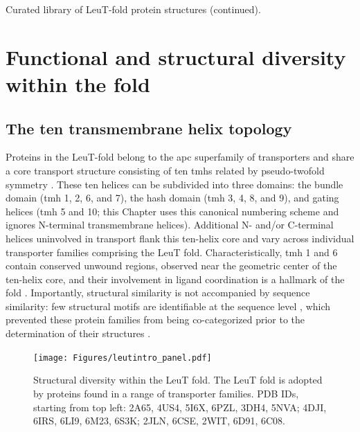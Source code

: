 \begin{table}[h!]
\scriptsize
\renewcommand{\tabcolsep}{0.15cm}
\centering
\caption[Curated library of LeuT-fold protein structures (continued).]{Curated library of LeuT-fold protein structures (continued).}

\label{tab:leutintro_proteins2}
\end{table}

\section{Functional and structural diversity within the fold}

\subsection{The ten transmembrane helix topology}

Proteins in the LeuT-fold belong to the \gls{apc} superfamily of transporters \citep*{Vastermark2014} and share a core transport structure consisting of ten \gls{tmh}s related by pseudo-twofold symmetry \citep*{Forrest2008, Kazmier2017}. These ten helices can be subdivided into three domains: the bundle domain (\gls{tmh} 1, 2, 6, and 7), the hash domain (\gls{tmh} 3, 4, 8, and 9), and gating helices (\gls{tmh} 5 and 10; this Chapter uses this canonical numbering scheme and ignores N-terminal transmembrane helices). Additional N- and/or C-terminal helices uninvolved in transport flank this ten-helix core and vary across individual transporter families comprising the LeuT fold. Characteristically, \gls{tmh} 1 and 6 contain conserved unwound regions, observed near the geometric center of the ten-helix core, and their involvement in ligand coordination is a hallmark of the fold \citep*{Screpanti2007}. Importantly, structural similarity is not accompanied by sequence similarity: few structural motifs are identifiable at the sequence level \citep*{Billesbølle2015, Malinauskaite2014, Stolzenberg2017}, which prevented these protein families from being co-categorized prior to the determination of their structures \citep*{Beuming2006}.

\begin{figure}[h!]
\centering
\texttt{[image: Figures/leutintro\_panel.pdf]}
 \caption[Structural diversity within the LeuT fold.]{Structural diversity within the LeuT fold. The LeuT fold is adopted by proteins found in a range of transporter families. PDB IDs, starting from top left: 2A65, 4US4, 5I6X, 6PZL, 3DH4, 5NVA; 4DJI, 6IRS, 6LI9, 6M23, 6S3K; 2JLN, 6CSE, 2WIT, 6D91, 6C08.}
\label{fig:leutintro_panel}
\end{figure}

